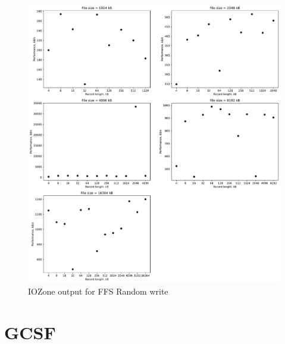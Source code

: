 \begin{figure}[!htb]
	\label{fig:app_bench_ffs_rnd_write}
	\begin{center}
		\includegraphics[width=1.0\textwidth]{figures/benchmarking/ffs/Random write.pdf}
	\end{center}
	\caption{IOZone output for FFS Random write}
\end{figure}

\section{GCSF}








